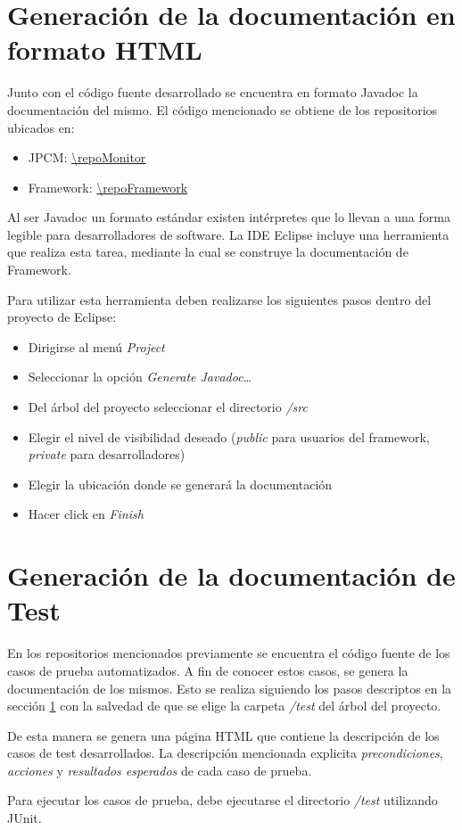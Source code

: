 \section{Generación de la documentación en formato HTML}
\label{genJavadoc}
Junto con el código fuente desarrollado se encuentra en formato Javadoc la
documentación del mismo. El código mencionado se obtiene de los repositorios
ubicados en:
\begin{itemize}
  \item JPCM: \url{\repoMonitor}
  \item \nombreFramework Framework: \url{\repoFramework}
\end{itemize}

 Al ser Javadoc un formato estándar existen intérpretes
que lo llevan a una forma legible para desarrolladores de software.
La IDE Eclipse incluye una herramienta que realiza esta tarea, mediante la cual
se construye la documentación de \nombreFramework Framework.

Para utilizar esta herramienta deben realizarse los siguientes pasos dentro del
proyecto de Eclipse:
\begin{itemize}
  \item Dirigirse al menú \textit{Project}
  \item Seleccionar la opción \textit{Generate Javadoc\ldots}
  \item Del árbol del proyecto seleccionar el directorio \textit{/src}
  \item Elegir el nivel de visibilidad deseado (\textit{public} para usuarios
  del framework, \textit{private} para desarrolladores)
  \item Elegir la ubicación donde se generará la documentación
  \item Hacer click en \textit{Finish}
\end{itemize}

\section{Generación de la documentación de Test}
En los repositorios mencionados previamente se encuentra el código fuente de los
casos de prueba automatizados. A fin de conocer estos casos, se genera la
documentación de los mismos.
Esto se realiza siguiendo los pasos descriptos en la sección \ref{genJavadoc}
con la salvedad de que se elige la carpeta \textit{/test} del árbol del proyecto.

De esta manera se genera una página HTML que contiene la descripción de los casos
de test desarrollados. La descripción mencionada explicita \textit{precondiciones}, \textit{acciones} y
\textit{resultados esperados} de cada caso de prueba.

Para ejecutar los casos de prueba, debe ejecutarse el directorio \textit{/test}
utilizando JUnit.
